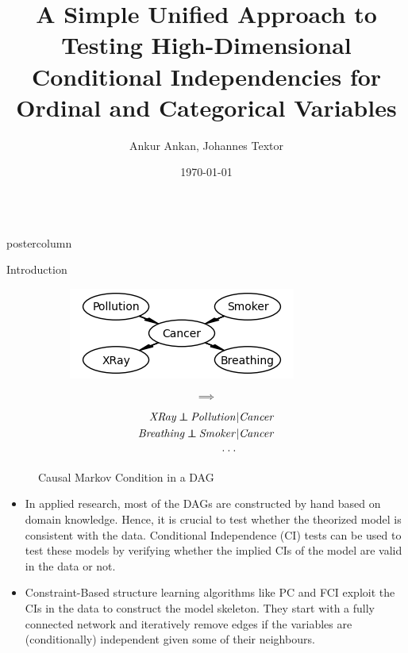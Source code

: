 \documentclass{beamer}
\title{\huge A Simple Unified Approach to Testing High-Dimensional Conditional Independencies for Ordinal and Categorical Variables}
\author{Ankur Ankan, Johannes Textor}
\institute[RU]{Institute for Computing and Information Sciences \\ Radboud University, Netherlands}
\date{\today}
\def\ci{\perp\!\!\!\!\!\perp}
\newlength{\columnheight}
\begin{document}
\begin{frame}
\begin{columns}
	\begin{column}{.33\textwidth}
		\begin{beamercolorbox}[center]{postercolumn}
			\begin{minipage}{.98\textwidth}  %
				\parbox[t][\columnheight]{\textwidth}{ %
	\begin{myblock}{Introduction}
		\begin{figure}
			\begin{subfigure}{0.4\textwidth}
				\centering
				\includegraphics[scale=1.5]{../in_person/imgs/example_dag.png}
			\end{subfigure}\hfill%
			\begin{subfigure}{0.1\textwidth}
				$$ \bm{\implies} $$
			\end{subfigure}\hfill%
			\begin{subfigure}{0.5\textwidth}
				\begin{equation*}
					\begin{split}
						\text{\emph{XRay}} \ci \text{\emph{Pollution}}  &| \text{\emph{Cancer}} \\
						\text{\emph{Breathing}} \ci \text{\emph{Smoker}} &| \text{\emph{Cancer}} \\
						\cdot \cdot \cdot & \\
					\end{split}
				\end{equation*}
			\end{subfigure}
			\caption*{Causal Markov Condition in a DAG \footnotemark}
		\end{figure}

		\begin{itemize}
			\item In applied research, most of the DAGs are constructed by
				hand based on domain knowledge. Hence, it is crucial 
				to test whether the theorized model is consistent with
				the data. Conditional Independence (CI) tests can be
				used to test these models by verifying whether the
				implied CIs of the model are valid in the data or not.
			\item Constraint-Based structure learning algorithms like PC and FCI exploit
				the CIs in the data to construct the model skeleton. They start with
				a fully connected network and iteratively remove edges if the variables 
				are (conditionally) independent given some of their neighbours.
		\end{itemize}


\end{myblock}}
\end{minipage}
\end{beamercolorbox}
\end{column}
\end{columns}
\end{frame}
\end{document}
